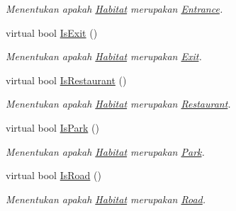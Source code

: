 \begin{DoxyCompactItemize}
\begin{DoxyCompactList}\small\item\em Menentukan apakah \hyperlink{classHabitat}{Habitat} merupakan \hyperlink{classEntrance}{Entrance}. \end{DoxyCompactList}\item 
virtual bool \hyperlink{classHabitat_aece5f38292630cf5860001ae8fdd084d}{Is\+Exit} ()
\begin{DoxyCompactList}\small\item\em Menentukan apakah \hyperlink{classHabitat}{Habitat} merupakan \hyperlink{classExit}{Exit}. \end{DoxyCompactList}\item 
virtual bool \hyperlink{classHabitat_a0ab72de6d88706b4eb693ea2a2c7de53}{Is\+Restaurant} ()
\begin{DoxyCompactList}\small\item\em Menentukan apakah \hyperlink{classHabitat}{Habitat} merupakan \hyperlink{classRestaurant}{Restaurant}. \end{DoxyCompactList}\item 
virtual bool \hyperlink{classHabitat_aa4cd06885065d8b7e3c4477c626d2fe7}{Is\+Park} ()
\begin{DoxyCompactList}\small\item\em Menentukan apakah \hyperlink{classHabitat}{Habitat} merupakan \hyperlink{classPark}{Park}. \end{DoxyCompactList}\item 
virtual bool \hyperlink{classHabitat_aafd95775cc1e0876b40955c3e0126fe3}{Is\+Road} ()
\begin{DoxyCompactList}\small\item\em Menentukan apakah \hyperlink{classHabitat}{Habitat} merupakan \hyperlink{classRoad}{Road}. \end{DoxyCompactList}\end{DoxyCompactItemize}
